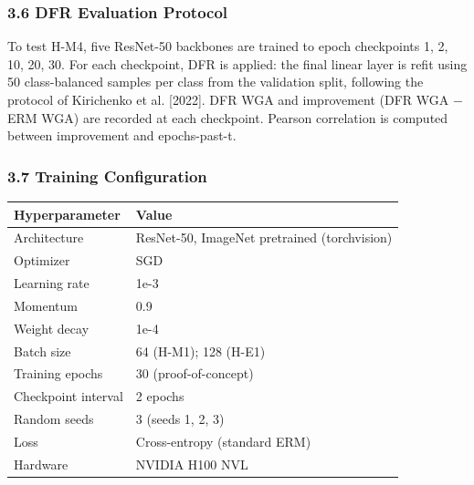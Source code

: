\subsubsection{3.6 DFR Evaluation Protocol}

To test H-M4, five ResNet-50 backbones are trained to epoch checkpoints {1, 2, 10, 20, 30}. For each checkpoint, DFR is applied: the final linear layer is refit using 50 class-balanced samples per class from the validation split, following the protocol of Kirichenko et al. [2022]. DFR WGA and improvement (DFR WGA − ERM WGA) are recorded at each checkpoint. Pearson correlation is computed between improvement and epochs-past-t\*.

\subsubsection{3.7 Training Configuration}

\begin{table}[htbp]
\centering
\begin{tabular}{ll}
\toprule
Hyperparameter & Value \\
\midrule
Architecture & ResNet-50, ImageNet pretrained (torchvision) \\
Optimizer & SGD \\
Learning rate & 1e-3 \\
Momentum & 0.9 \\
Weight decay & 1e-4 \\
Batch size & 64 (H-M1); 128 (H-E1) \\
Training epochs & 30 (proof-of-concept) \\
Checkpoint interval & 2 epochs \\
Random seeds & 3 (seeds 1, 2, 3) \\
Loss & Cross-entropy (standard ERM) \\
Hardware & NVIDIA H100 NVL \\
\bottomrule
\end{tabular}
\end{table}

